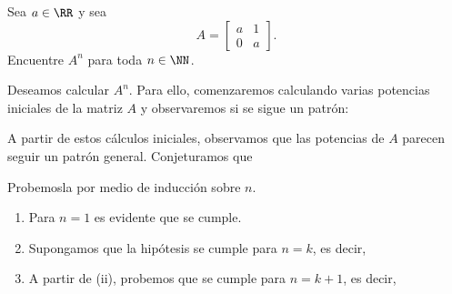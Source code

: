 \begin{examplebox}{}{}
    Sea $a \in \RR$ y sea
    $$A = \begin{bmatrix}
        a & 1 \\
        0 & a
    \end{bmatrix}.$$
    Encuentre $A^n$ para toda $n \in \NN$.

    \tcblower
    \solucion Deseamos calcular $A^n$. Para ello, comenzaremos calculando varias potencias iniciales de la matriz $A$ y observaremos si se sigue un patrón:
    \begin{matrizn}
    \end{matrizn}
    A partir de estos cálculos iniciales, observamos que las potencias de $A$ parecen seguir un patrón general. Conjeturamos que
    \begin{matrizn}
    \end{matrizn}
    Probemosla por medio de inducción sobre $n$.
    \begin{enumerate}[label=\roman*., topsep=6pt, itemsep=0pt]
        \item Para $n = 1$ es evidente que se cumple.
        \item Supongamos que la hipótesis se cumple para $n = k$, es decir,
        \begin{matrizn}
        \end{matrizn}
        \item A partir de (ii), probemos que se cumple para $n = k + 1$, es decir,
        \begin{matrizn}

\end{matrizn}
\end{enumerate}
\end{examplebox}
